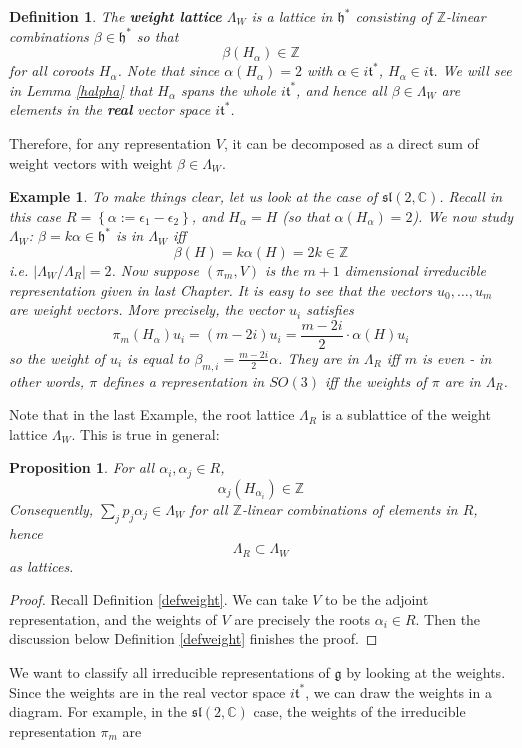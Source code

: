 \documentclass[11pt]{article}
\newtheorem{proposition}[theorem]{Proposition}
\newtheorem{example}[theorem]{Example}
\newtheorem{definition}[theorem]{Definition}
\newcommand{\bb}[1]{\mathbb{#1}}
\newcommand{\mf}[1]{\mathfrak{#1}}
\begin{document}
\begin{definition}
The \textbf{weight lattice} $\Lambda_W$ is a lattice in $\mf{h}^*$ consisting of $\bb{Z}$-linear combinations $\beta \in \mf{h}^*$ so that
$$\beta(H_{\alpha}) \in \bb{Z}$$
for all coroots $H_{\alpha}$. Note that since $\alpha(H_{\alpha}) = 2$ with $\alpha \in i\mf{t}^*$, $H_{\alpha} \in i\mf{t}$. We will see in Lemma \ref{halpha} that $H_{\alpha}$ spans the whole $i\mf{t}^*$, and hence all $\beta \in \Lambda_W$ are elements in the \textbf{real} vector space $i \mf{t}^*$.
\end{definition}
Therefore, for any representation $V$, it can be decomposed as a direct sum of weight vectors with weight $\beta \in \Lambda_W$.
\begin{example}
To make things clear, let us look at the case of $\mf{sl}(2,\bb{C})$. Recall in this case $R = \left\{\alpha := \epsilon_1 - \epsilon_2\right\}$, and $H_{\alpha} = H$ (so that $\alpha(H_{\alpha}) = 2$). We now study $\Lambda_W$: $\beta = k\alpha \in \mf{h}^*$ is in $\Lambda_W$ iff
$$\beta(H) = k\alpha(H) = 2k \in \bb{Z}$$
i.e. $|\Lambda_W/\Lambda_R| = 2$. Now suppose $(\pi_m, V)$ is the $m+1$ dimensional irreducible representation given in last Chapter. It is easy to see that the vectors $u_0, \dots, u_m$ are weight vectors. More precisely, the vector $u_i$ satisfies
$$\pi_m(H_{\alpha})u_i = (m-2i)u_i = \frac{m-2i}{2} \cdot \alpha(H) u_i$$
so the weight of $u_i$ is equal to $\beta_{m,i} = \frac{m-2i}{2}\alpha$. They are in $\Lambda_R$ iff $m$ is even - in other words, $\pi$ defines a representation in $SO(3)$ iff the weights of $\pi$ are in $\Lambda_R$.
\end{example}
Note that in the last Example, the root lattice $\Lambda_R$ is a sublattice of the weight lattice $\Lambda_W$. This is true in general:
\begin{proposition} \label{wtroot}
For all $\alpha_i, \alpha_j \in R$,
$$\alpha_j(H_{\alpha_i}) \in \bb{Z}$$
Consequently, $\sum_j p_j \alpha_j \in \Lambda_W$ for all $\bb{Z}$-linear combinations of elements in $R$, hence
$$\Lambda_R \subset \Lambda_W$$
as lattices.
\end{proposition}
\begin{proof}
Recall Definition \ref{defweight}. We can take $V$ to be the adjoint representation, and the weights of $V$ are precisely the roots $\alpha_i \in R$. Then the discussion below Definition \ref{defweight} finishes the proof.
\end{proof}
We want to classify all irreducible representations of $\mf{g}$ by looking at the weights. Since the weights are in the real vector space $i \mf{t}^*$, we can draw the weights in a diagram. For example, in the $\mf{sl}(2,\bb{C})$ case, the weights of the irreducible representation $\pi_m$ are
\end{document}
